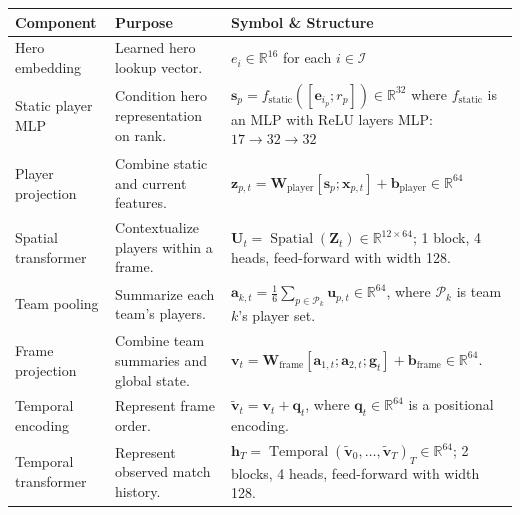 \documentclass[11pt]{article}
\begin{document}
    \begin{table}[H]
    \centering
    \small
    \renewcommand{\arraystretch}{1.3}
    \setlength{\tabcolsep}{5pt}

    \begin{tabularx}{\textwidth}{
        >{\raggedright\arraybackslash}p{}
        >{\raggedright\arraybackslash}X
        >{\raggedright\arraybackslash}p{}
    }
    \toprule
    \textbf{Component} &
    \textbf{Purpose} &
    \textbf{Symbol \& Structure} \\
    \midrule

    Hero embedding &
    Learned hero lookup vector. &
    $e_i \in \mathbb{R}^{16}$ for each $i \in \mathcal{I}$\\

    Static player MLP &
    Condition hero representation on rank. &
    $\mathbf{s}_p=f_{\mathrm{static}}([\mathbf{e}_{i_p};r_p]) \in\mathbb{R}^{32}$ where $f_{\mathrm{static}}$ is an MLP with ReLU layers
    MLP: $17\rightarrow32\rightarrow32$\\

    Player projection &
    Combine static and current features. &
    $\mathbf{z}_{p,t} =\mathbf{W}_{\mathrm{player}} [\mathbf{s}_p;\mathbf{x}_{p,t}] +\mathbf{b}_{\mathrm{player}} \in\mathbb{R}^{64}$\\

    Spatial transformer &
    Contextualize players within a frame. &
    $\mathbf{U}_t =\operatorname{Spatial}(\mathbf{Z}_t) \in\mathbb{R}^{12\times64}$; 1 block, 4 heads, feed-forward with width 128. \\

    Team pooling &
    Summarize each team's players. &
    $\displaystyle\mathbf{a}_{k,t}=\frac{1}{6}\sum_{p\in\mathcal{P}_k}\mathbf{u}_{p,t}\in\mathbb{R}^{64}$, where $\mathcal{P}_k$ is team $k$'s player set. \\

    Frame projection &
    Combine team summaries and global state. &
    $\mathbf{v}_t=\mathbf{W}_{\mathrm{frame}}[\mathbf{a}_{1,t};\mathbf{a}_{2,t};\mathbf{g}_t]+\mathbf{b}_{\mathrm{frame}}\in\mathbb{R}^{64}$. \\

    Temporal encoding &
    Represent frame order. &
    $\tilde{\mathbf{v}}_t=\mathbf{v}_t+\mathbf{q}_t$, where $\mathbf{q}_t\in\mathbb{R}^{64}$ is a positional encoding. \\

    Temporal transformer &
    Represent observed match history. &
    $\mathbf{h}_T=\operatorname{Temporal}(\tilde{\mathbf{v}}_0,\ldots,\tilde{\mathbf{v}}_T)_T\in\mathbb{R}^{64}$; 2 blocks, 4 heads, feed-forward with width 128. \\


\end{tabularx}
\end{table}
\end{document}
